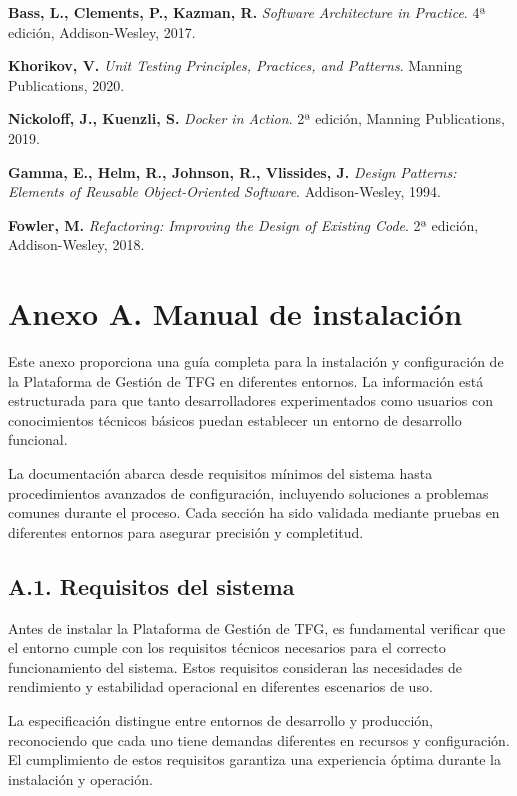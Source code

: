 \documentclass[12pt,a4paper,oneside]{report}
\begin{document}
\noindent
[22] \textbf{Bass, L., Clements, P., Kazman, R.} \textit{Software Architecture in Practice}. 4ª edición, Addison-Wesley, 2017.

\noindent
[23] \textbf{Khorikov, V.} \textit{Unit Testing Principles, Practices, and Patterns}. Manning Publications, 2020.

\noindent
[24] \textbf{Nickoloff, J., Kuenzli, S.} \textit{Docker in Action}. 2ª edición, Manning Publications, 2019.

\noindent
[25] \textbf{Gamma, E., Helm, R., Johnson, R., Vlissides, J.} \textit{Design Patterns: Elements of Reusable Object-Oriented Software}. Addison-Wesley, 1994.

\noindent
[26] \textbf{Fowler, M.} \textit{Refactoring: Improving the Design of Existing Code}. 2ª edición, Addison-Wesley, 2018.


\newpage

\chapter{Anexo A. Manual de
instalación}\label{anexo-a.-manual-de-instalaciuxf3n}
Este anexo proporciona una guía completa para la instalación y configuración de la Plataforma de Gestión de TFG en diferentes entornos. La información está estructurada para que tanto desarrolladores experimentados como usuarios con conocimientos técnicos básicos puedan establecer un entorno de desarrollo funcional.

La documentación abarca desde requisitos mínimos del sistema hasta procedimientos avanzados de configuración, incluyendo soluciones a problemas comunes durante el proceso. Cada sección ha sido validada mediante pruebas en diferentes entornos para asegurar precisión y completitud.

\section{A.1. Requisitos del sistema}\label{a.1.-requisitos-del-sistema}

Antes de instalar la Plataforma de Gestión de TFG, es fundamental verificar que el entorno cumple con los requisitos técnicos necesarios para el correcto funcionamiento del sistema. Estos requisitos consideran las necesidades de rendimiento y estabilidad operacional en diferentes escenarios de uso.

La especificación distingue entre entornos de desarrollo y producción, reconociendo que cada uno tiene demandas diferentes en recursos y configuración. El cumplimiento de estos requisitos garantiza una experiencia óptima durante la instalación y operación.
\end{document}

